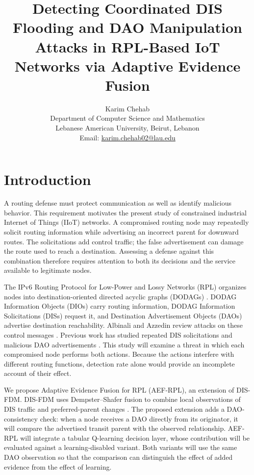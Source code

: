 \documentclass[journal]{IEEEtran}
\title{Detecting Coordinated DIS Flooding and DAO Manipulation Attacks in RPL-Based IoT Networks via Adaptive Evidence Fusion}
\author{Karim Chehab\\[0.5ex]
\normalsize Department of Computer Science and Mathematics\\
\normalsize Lebanese American University, Beirut, Lebanon\\
\normalsize Email: \href{mailto:karim.chehab02@lau.edu}{karim.chehab02@lau.edu}}
\date{}
\begin{document}
\maketitle

\section{Introduction}\label{sec:introduction}
A routing defense must protect communication as well as identify malicious behavior. This requirement motivates the present study of constrained industrial Internet of Things (IIoT) networks. A compromised routing node may repeatedly solicit routing information while advertising an incorrect parent for downward routes. The solicitations add control traffic; the false advertisement can damage the route used to reach a destination. Assessing a defense against this combination therefore requires attention to both its decisions and the service available to legitimate nodes.

The IPv6 Routing Protocol for Low-Power and Lossy Networks (RPL) organizes nodes into destination-oriented directed acyclic graphs (DODAGs) \cite{rfc6550}. DODAG Information Objects (DIOs) carry routing information, DODAG Information Solicitations (DISs) request it, and Destination Advertisement Objects (DAOs) advertise destination reachability. Albinali and Azzedin review attacks on these control messages \cite{albinali2024}. Previous work has studied repeated DIS solicitations \cite{rajasekar2022,vermaranga2020,medjek2021} and malicious DAO advertisements \cite{pu2018,limsd2024}. This study will examine a threat in which each compromised node performs both actions. Because the actions interfere with different routing functions, detection rate alone would provide an incomplete account of their effect.

We propose Adaptive Evidence Fusion for RPL (AEF-RPL), an extension of DIS-FDM. DIS-FDM uses Dempster--Shafer fusion to combine local observations of DIS traffic and preferred-parent changes \cite{prajisha2025}. The proposed extension adds a DAO-consistency check: when a node receives a DAO directly from its originator, it will compare the advertised transit parent with the observed relationship. AEF-RPL will integrate a tabular Q-learning decision layer, whose contribution will be evaluated against a learning-disabled variant. Both variants will use the same DAO observation so that the comparison can distinguish the effect of added evidence from the effect of learning.
\end{document}
